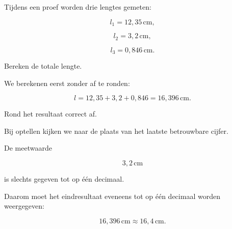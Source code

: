 \documentclass{ximera}
\begin{document}
\begin{oefening}{\oefU}

Tijdens een proef worden drie lengtes gemeten:

\[
l_1=12{,}35\,\si{\centi\meter},
\]

\[
l_2=3{,}2\,\si{\centi\meter},
\]

\[
l_3=0{,}846\,\si{\centi\meter}.
\]

\begin{question}
Bereken de totale lengte.

\begin{oplossing}
We berekenen eerst zonder af te ronden:

\[
l
=
12{,}35+3{,}2+0{,}846
=
16{,}396\,\si{\centi\meter}.
\]
\end{oplossing}
\end{question}


\begin{question}
Rond het resultaat correct af.

\begin{oplossing}
Bij optellen kijken we naar de plaats van het laatste betrouwbare cijfer.

De meetwaarde

\[
3{,}2\,\si{\centi\meter}
\]

is slechts gegeven tot op één decimaal.

Daarom moet het eindresultaat eveneens tot op één decimaal worden weergegeven:

\[
16{,}396\,\si{\centi\meter}
\approx
\boxed{16{,}4\,\si{\centi\meter}}.
\]
\end{oplossing}
\end{question}

\end{oefening}
\end{document}
